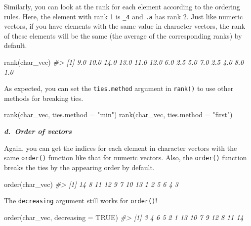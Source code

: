 \documentclass[
]{book}
\newenvironment{Shaded}{\begin{snugshade}}{\end{snugshade}}
\newcommand{\AttributeTok}[1]{\textcolor[rgb]{0.77,0.63,0.00}{#1}}
\newcommand{\CommentTok}[1]{\textcolor[rgb]{0.56,0.35,0.01}{\textit{#1}}}
\newcommand{\ConstantTok}[1]{\textcolor[rgb]{0.00,0.00,0.00}{#1}}
\newcommand{\FunctionTok}[1]{\textcolor[rgb]{0.00,0.00,0.00}{#1}}
\newcommand{\NormalTok}[1]{#1}
\newcommand{\StringTok}[1]{\textcolor[rgb]{0.31,0.60,0.02}{#1}}
\begin{document}
Similarly, you can look at the rank for each element according to the ordering rules. Here, the element with rank 1 is \texttt{\_4} and \texttt{.a} has rank 2. Just like numeric vectors, if you have elements with the same value in character vectors, the rank of these elements will be the same (the average of the corresponding ranks) by default.

\begin{Shaded}
\begin{Highlighting}[]
\FunctionTok{rank}\NormalTok{(char\_vec)}
\CommentTok{\#\textgreater{}  [1]  9.0 10.0 14.0 13.0 11.0 12.0  6.0  2.5  5.0  7.0  2.5  4.0  8.0  1.0}
\end{Highlighting}
\end{Shaded}

As expected, you can set the \texttt{ties.method} argument in \texttt{rank()} to use other methods for breaking ties.

\begin{Shaded}
\begin{Highlighting}[]
\FunctionTok{rank}\NormalTok{(char\_vec, }\AttributeTok{ties.method =} \StringTok{"min"}\NormalTok{)}
\FunctionTok{rank}\NormalTok{(char\_vec, }\AttributeTok{ties.method =} \StringTok{"first"}\NormalTok{)}
\end{Highlighting}
\end{Shaded}

\textbf{\emph{d.~Order of vectors}}

Again, you can get the indices for each element in character vectors with the same \texttt{order()} function like that for numeric vectors. Also, the \texttt{order()} function breaks the ties by the appearing order by default.

\begin{Shaded}
\begin{Highlighting}[]
\FunctionTok{order}\NormalTok{(char\_vec)}
\CommentTok{\#\textgreater{}  [1] 14  8 11 12  9  7 10 13  1  2  5  6  4  3}
\end{Highlighting}
\end{Shaded}

The \texttt{decreasing} argument still works for \texttt{order()}!

\begin{Shaded}
\begin{Highlighting}[]
\FunctionTok{order}\NormalTok{(char\_vec, }\AttributeTok{decreasing =} \ConstantTok{TRUE}\NormalTok{)}
\CommentTok{\#\textgreater{}  [1]  3  4  6  5  2  1 13 10  7  9 12  8 11 14}
\end{Highlighting}
\end{Shaded}
\end{document}
